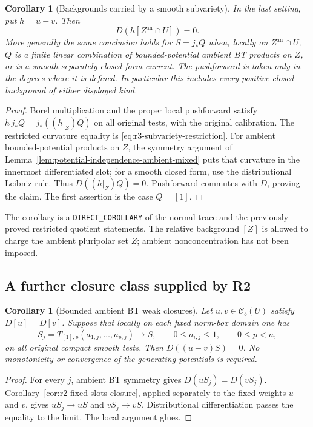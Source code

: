 \documentclass[11pt,a4paper]{article}
\numberwithin{equation}{section}
\newtheorem{corollary}[theorem]{Corollary}
\theoremstyle{definition}
\theoremstyle{remark}
\newcommand{\Cb}{\mathcal C_b}
\newcommand{\an}{\mathrm{an}}
\begin{document}
\begin{corollary}[Backgrounds carried by a smooth subvariety]
\label{cor:r3-subvariety-potential-quotient}
In the last setting, put $h=u-v$. Then
\[
 D(h[Z^{\an}\cap U])=0.
\]
More generally the same conclusion holds for $S=j_*Q$ when,
locally on $Z^{\an}\cap U$, $Q$ is a finite linear combination
of bounded-potential ambient BT products on $Z$, or is a smooth
separately closed form current. The pushforward is taken only
in the degrees where it is defined. In particular this includes
every positive closed background of either displayed kind.
\end{corollary}

\begin{proof}
Borel multiplication and the proper local pushforward satisfy
$h\,j_*Q=j_*((h|_Z)Q)$ on all original tests, with the
original calibration. The restricted curvature equality is
\eqref{eq:r3-subvariety-restriction}. For ambient bounded-potential
products on $Z$, the symmetry argument of
Lemma~\ref{lem:potential-independence-ambient-mixed} puts that
curvature in the innermost differentiated slot; for a smooth
closed form, use the distributional Leibniz rule. Thus
$D((h|_Z)Q)=0$. Pushforward commutes with $D$, proving the claim.
The first assertion is the case $Q=[1]$.
\end{proof}

The corollary is a \texttt{DIRECT\_COROLLARY} of the normal trace
and the previously proved restricted quotient statements. The
relative background $[Z]$ is allowed to charge the ambient
pluripolar set $Z$; ambient nonconcentration has not been imposed.

\subsection{A further closure class supplied by R2}

\begin{corollary}[Bounded ambient BT weak closures]
\label{cor:r3-bounded-bt-quotient-closure}
Let $u,v\in\Cb(U)$ satisfy $D[u]=D[v]$. Suppose that locally
on each fixed norm-box domain one has
\[
 S_j=T_{[1],p}(a_{1,j},\ldots,a_{p,j})\longrightarrow S,
 \qquad 0\leq a_{i,j}\leq1,
 \qquad 0\leq p<n,
\]
on all original compact smooth tests. Then
$D((u-v)S)=0$. No monotonicity or convergence of the
generating potentials is required.
\end{corollary}

\begin{proof}
For every $j$, ambient BT symmetry gives $D(uS_j)=D(vS_j)$.
Corollary~\ref{cor:r2-fixed-slots-closure}, applied separately
to the fixed weights $u$ and $v$, gives
$uS_j\to uS$ and $vS_j\to vS$. Distributional differentiation
passes the equality to the limit. The local argument glues.
\end{proof}
\end{document}
